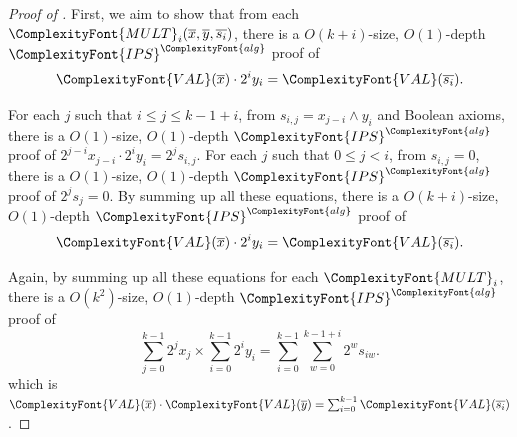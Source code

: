 \documentclass[11pt,letter]{article}
\theoremstyle{remark} %
\newcommand{\alg}{\ComplexityFont{alg}}
\newcommand{\IPS}{%
    {
        \ComplexityFont{IPS} 
    }
}
\newcommand{\VAL}{ %
    {
        \ComplexityFont{VAL}
    }
}
\newcommand{\mult}{ %
    {
        \ComplexityFont{MULT}
    }
}
\begin{document}
{\begin{proof}[Proof of ]
        First, we aim to show that from each $\mult_i(\overline{x},\overline{y},\overline{s_i})$, there is a $O(k+i)$-size, $O(1)$-depth $\IPS^\alg$ proof of
        \[
            \VAL(\overline{x}) \cdot 2^i y_i = \VAL(\overline{s_i}).
        \]
    
        For each $j$ such that $i \leq j \leq k-1+i$, from $s_{i,j} = x_{j-i} \land y_i$ and Boolean axioms, there is a $O(1)$-size, $O(1)$-depth $\IPS^\alg$ proof of $2^{j-i} x_{j-i} \cdot 2^i y_i = 2^j s_{i,j}$. For each $j$ such that $0 \leq j  < i$, from $s_{i,j} =0$, there is a $O(1)$-size, $O(1)$-depth $\IPS^\alg$ proof of $2^j s_j = 0$. By summing up all these equations, there is a $O(k+i)$-size, $O(1)$-depth $\IPS^\alg$ proof of
        \[
            \VAL(\overline{x}) \cdot 2^i y_i = \VAL(\overline{s_i}).
        \]

        Again, by summing up all these equations for each $\mult_i$, there is a $O(k^2)$-size, $O(1)$-depth $\IPS^\alg$ proof of
        \[
        \sum_{j=0}^{k-1} 2^j x_j \times \sum_{i=0}^{k-1} 2^i y_i = \sum_{i=0}^{k-1} \sum_{w=0}^{k-1+i} 2^w s_{iw}.
    \]
    which is $\VAL(\overline{x})\cdot \VAL(\overline{y})=\sum_{i=0}^{k-1} \VAL(\overline{s_i})$.
    \end{proof}

}
\end{document}
